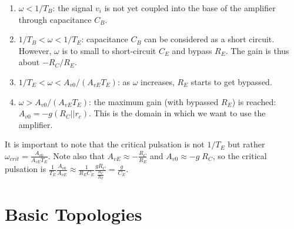 \begin{enumerate}
	\item $\omega < 1/T_B$: the signal $v_i$ is not yet coupled into the base of the amplifier through capacitance $C_B$.
	\item  $1/T_B < \omega < 1/T_E$: capacitance $C_B$ can be considered as a short circuit. However, $\omega$ is to small to short-circuit $C_E$ and bypass $R_E$. The gain is thus about $-R_C/R_E$.
	\item $1/T_E < \omega < A_{v0}/(A_{vE} T_E)$: as $\omega$ increases, $R_E$ starts to get bypassed.
	\item $\omega > A_{v0}/(A_{vE} T_E)$: the maximum gain (with bypassed $R_E$) is reached: $A_{v0} = -g (R_C || r_c)$. This is the domain in which we want to use the amplifier.
\end{enumerate}
It is important to note that the critical pulsation is not $1/T_E$ but rather $\omega_{crit} = \frac{A_{v0}}{A_{vE} T_E}$. Note also that $A_{vE} \approx -\frac{R_C}{R_E}$ and $A_{v0} \approx -g\;R_C$, so the critical pulsation is $\frac{1}{T_E} \frac{A_{v0}}{A_{vE}} \approx \frac{1}{R_E C_E} \frac{g R_C}{\frac{R_C}{R_E}} = \frac{g}{C_E}$.

\newpage
\section{Basic Topologies}
